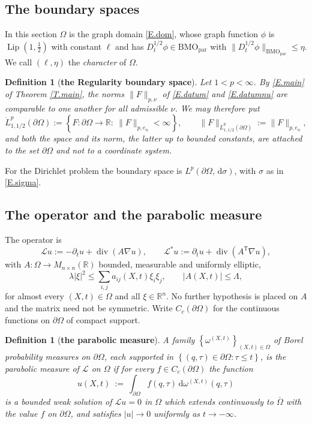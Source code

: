 \documentclass[10pt,a4paper]{amsart}
\numberwithin{equation}{section}
\DeclareMathOperator{\Lip}{Lip}
\DeclareMathOperator{\divg}{div}
\newcommand{\R}{\mathbb R}
\newcommand{\abs}[1]{\left\vert#1\right\vert}
\newcommand{\br}[1]{\left(#1\right)}
\newcommand{\set}[1]{\left\{#1\right\}}
\newcommand{\om}{\Omega}
\newcommand{\pom}{\partial\Omega}
\newcommand{\pd}{\partial}
\newcommand{\dhalf}{D_t^{1/2}}
\newcommand{\BMOpar}{\mathrm{BMO}_{\mathrm{par}}}
\newcommand{\LL}{\mathcal L}
\renewcommand{\d}{\,\mathrm d}
\newtheorem{definition}[equation]{Definition}
\begin{document}
\subsection{The boundary spaces}\label{ss.bdyspaces}

In this section $\om$ is the graph domain \eqref{E.dom}, whose graph function
$\phi$ is $\Lip(1,\tfrac12)$ with constant $\ell$ and has
$\dhalf\phi\in\BMOpar$ with $\|\dhalf\phi\|_{\BMOpar}\le\eta$. We call
$(\ell,\eta)$ the \emph{character} of $\om$.

\begin{definition}[\bf the Regularity boundary space]\label{D.bdyspace}
Let $1<p<\infty$. By \eqref{E.main} of Theorem \ref{T.main}, the norms
$\|F\|_{p,\nu}$ of \eqref{E.datum} and \eqref{E.datumnu} are comparable to
one another for all admissible $\nu$. We may
therefore put
\begin{equation}\label{E.bdyspace}
  \dot L^p_{1,1/2}(\pom):=\set{F:\pom\to\R:\ \|F\|_{p,e_n}<\infty},\qquad
  \|F\|_{\dot L^p_{1,1/2}(\pom)}:=\|F\|_{p,e_n} ,
\end{equation}
and both the space and its norm, the latter up to bounded constants, are
attached to the set $\pom$ and not to a coordinate system.
\end{definition}

\noindent For the Dirichlet problem the boundary space is
$L^p(\pom,\d\sigma)$, with $\sigma$ as in \eqref{E.sigma}.\medskip

\subsection{The operator and the parabolic measure}\label{ss.pm}

The operator is
\begin{equation}\label{E.pde}
  \LL u:=-\pd_tu+\divg\br{A\nabla u},\qquad
  \LL^*u:=\pd_tu+\divg\br{A^{\mathsf T}\nabla u},
\end{equation}
with $A:\om\to M_{n\times n}(\R)$ bounded, measurable and uniformly elliptic,
\begin{equation}\label{E.elliptic}
  \lambda\abs\xi^2\le\sum_{i,j}a_{ij}(X,t)\xi_i\xi_j,\qquad
  \abs{A(X,t)}\le\Lambda ,
\end{equation}
for almost every $(X,t)\in\om$ and all $\xi\in\R^n$. No further hypothesis is
placed on $A$ and the matrix need not be symmetric. Write $C_c(\pom)$ for the
continuous functions on $\pom$ of compact support.

\begin{definition}[\bf the parabolic measure]\label{D.pm}
A family $\set{\omega^{(X,t)}}_{(X,t)\in\om}$ of Borel probability measures on
$\pom$, each supported in $\set{(q,\tau)\in\pom:\tau\le t}$, is the \emph{parabolic
measure} of $\LL$ on $\om$ if for every $f\in C_c(\pom)$ the function
\begin{equation}\label{E.pmsol}
  u(X,t)\ :=\ \int_{\pom}f(q,\tau)\d\omega^{(X,t)}(q,\tau)
\end{equation}
is a bounded weak solution of $\LL u=0$ in $\om$ which extends continuously to
$\overline\om$ with the value $f$ on $\pom$, and satisfies $\abs u\to0$
uniformly as $t\to-\infty$.
\end{definition}
\end{document}
